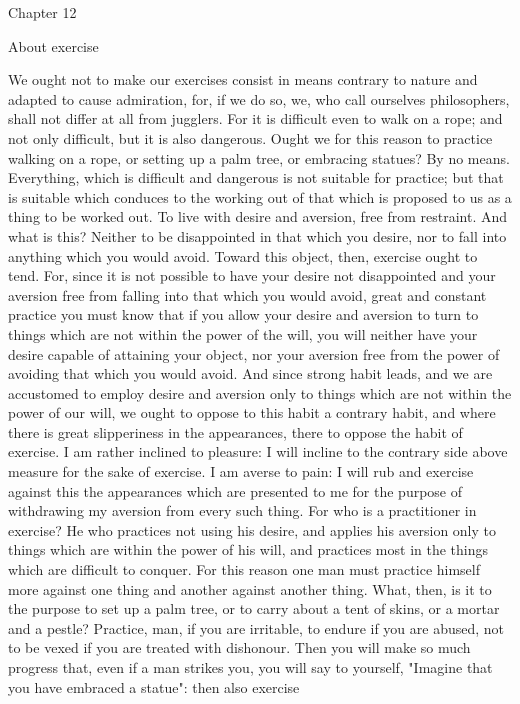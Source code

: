 \documentclass[a4paper]{article}
\begin{document}
Chapter 12

About exercise

    We ought not to make our exercises consist in means contrary to nature and
adapted to cause admiration, for, if we do so, we, who call ourselves
philosophers, shall not differ at all from jugglers. For it is difficult even
to walk on a rope; and not only difficult, but it is also dangerous. Ought we
for this reason to practice walking on a rope, or setting up a palm tree, or
embracing statues? By no means. Everything, which is difficult and dangerous is
not suitable for practice; but that is suitable which conduces to the working
out of that which is proposed to us as a thing to be worked out. To live with
desire and aversion, free from restraint. And what is this? Neither to be
disappointed in that which you desire, nor to fall into anything which you
would avoid. Toward this object, then, exercise ought to tend. For, since it is
not possible to have your desire not disappointed and your aversion free from
falling into that which you would avoid, great and constant practice you must
know that if you allow your desire and aversion to turn to things which are not
within the power of the will, you will neither have your desire capable of
attaining your object, nor your aversion free from the power of avoiding that
which you would avoid. And since strong habit leads, and we are accustomed to
employ desire and aversion only to things which are not within the power of our
will, we ought to oppose to this habit a contrary habit, and where there is
great slipperiness in the appearances, there to oppose the habit of exercise.
    I am rather inclined to pleasure: I will incline to the contrary side above
measure for the sake of exercise. I am averse to pain: I will rub and exercise
against this the appearances which are presented to me for the purpose of
withdrawing my aversion from every such thing. For who is a practitioner in
exercise? He who practices not using his desire, and applies his aversion only
to things which are within the power of his will, and practices most in the
things which are difficult to conquer. For this reason one man must practice
himself more against one thing and another against another thing. What, then,
is it to the purpose to set up a palm tree, or to carry about a tent of skins,
or a mortar and a pestle? Practice, man, if you are irritable, to endure if you
are abused, not to be vexed if you are treated with dishonour. Then you will
make so much progress that, even if a man strikes you, you will say to
yourself, "Imagine that you have embraced a statue": then also exercise
\end{document}

